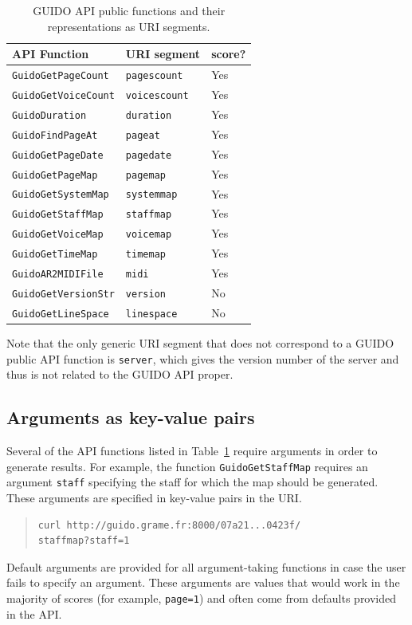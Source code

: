 \documentclass[11pt,a4paper]{article}
\newcommand{\guidosize}{7pt}
\begin{document}
\begin{table}
\begin{tabular}{|l|l|l|}\hline
API Function & URI segment & score? \\\hline
\verb=GuidoGetPageCount= & \verb=pagescount= & Yes \\\hline
\verb=GuidoGetVoiceCount= & \verb=voicescount= & Yes \\\hline
\verb=GuidoDuration= & \verb=duration= & Yes \\\hline
\verb=GuidoFindPageAt= & \verb=pageat= & Yes \\\hline
\verb=GuidoGetPageDate= & \verb=pagedate= & Yes \\\hline
\verb=GuidoGetPageMap= & \verb=pagemap= & Yes \\\hline
\verb=GuidoGetSystemMap= & \verb=systemmap= & Yes \\\hline
\verb=GuidoGetStaffMap= & \verb=staffmap= & Yes \\\hline
\verb=GuidoGetVoiceMap= & \verb=voicemap= & Yes \\\hline
\verb=GuidoGetTimeMap= & \verb=timemap= & Yes \\\hline
\verb=GuidoAR2MIDIFile= & \verb=midi= & Yes \\\hline
\verb=GuidoGetVersionStr= & \verb=version= & No \\\hline
\verb=GuidoGetLineSpace= & \verb=linespace= & No \\\hline
\end{tabular}
\cprotect\caption{\label{table:table1} GUIDO API public functions and their representations as URI segments.}
\end{table}
Note that the only generic URI segment that does not correspond to a GUIDO public API function is \verb=server=, which gives the version number of the server and thus is not related to the GUIDO API proper.
\subsection{Arguments as key-value pairs}
Several of the API functions listed in Table~\ref{table:table1} require arguments in order to generate results.  For example, the function \verb=GuidoGetStaffMap= requires an argument \verb=staff= specifying the staff for which the map should be generated.  These arguments are specified in key-value pairs in the URI.
\begin{quote}
\begingroup
\fontsize{\guidosize}{12pt}\selectfont
\begin{verbatim}
curl http://guido.grame.fr:8000/07a21...0423f/
staffmap?staff=1
\end{verbatim}
\endgroup
\end{quote}
Default arguments are provided for all argument-taking functions in case the user fails to specify an argument.  These arguments are values that would work in the majority of scores (for example, \verb&page=1&) and often come from defaults provided in the API.
\end{document}

